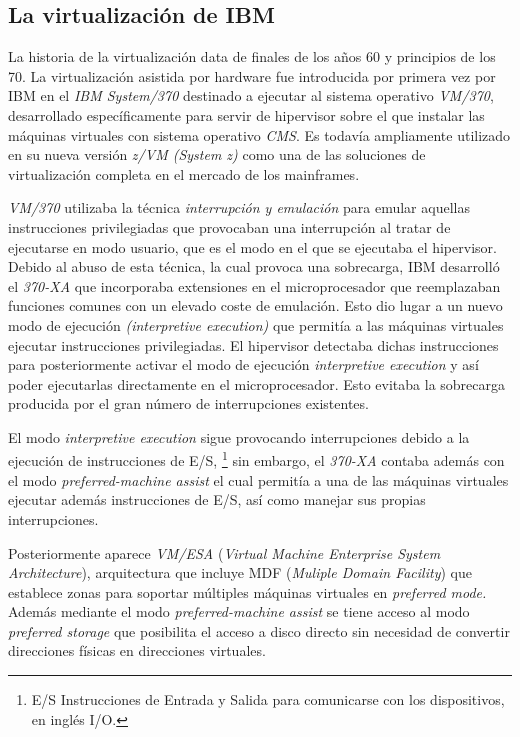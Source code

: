 \documentclass[spanisheDIVcalc,twoside,parskip-,pointlessnumbers,final]{scrbook}
\begin{document}
\subsection{La virtualización de IBM}

La historia de la virtualización data de finales de los años 60 y
principios de los 70. La virtualización asistida por hardware fue
introducida por primera vez por IBM en el \emph{IBM System/370} destinado
a ejecutar al sistema operativo \emph{VM/370}, desarrollado específicamente
para servir de hipervisor sobre el que instalar las máquinas virtuales
con sistema operativo \emph{CMS}. Es todavía ampliamente utilizado
en su nueva versión \emph{z/VM (System z)} como una de las soluciones
de virtualización completa en el mercado de los mainframes.

\emph{VM/370} utilizaba la técnica \emph{interrupción y emulación}
para emular aquellas instrucciones privilegiadas que provocaban una
interrupción al tratar de ejecutarse en modo usuario, que es el modo
en el que se ejecutaba el hipervisor. Debido al abuso de esta técnica,
la cual provoca una sobrecarga, IBM desarrolló el \emph{370-XA} que
incorporaba extensiones en el microprocesador que reemplazaban funciones
comunes con un elevado coste de emulación. Esto dio lugar a un nuevo
modo de ejecución \emph{(interpretive execution) }que permitía a las
máquinas virtuales ejecutar instrucciones privilegiadas. El hipervisor
detectaba dichas instrucciones para posteriormente activar el modo
de ejecución \emph{interpretive execution }y así poder ejecutarlas
directamente en el microprocesador. Esto evitaba la sobrecarga producida
por el gran número de interrupciones existentes.

El modo \emph{interpretive execution }sigue provocando interrupciones
debido a la ejecución de instrucciones de E/S,%
\footnote{E/S Instrucciones de Entrada y Salida para comunicarse con los dispositivos,
en inglés I/O.%
} sin embargo, el \emph{370-XA} contaba además con el modo \emph{preferred-machine
assist }el cual permitía a una de las máquinas virtuales ejecutar
además instrucciones de E/S, así como manejar sus propias interrupciones.

Posteriormente aparece \emph{VM/ESA} (\emph{Virtual Machine Enterprise
System Architecture}), arquitectura que incluye MDF (\emph{Muliple
Domain Facility}) que establece zonas para soportar múltiples máquinas
virtuales en \emph{preferred mode.} Además mediante el modo \emph{preferred-machine
assist} se tiene acceso al modo \emph{preferred storage }que posibilita
el acceso a disco directo sin necesidad de convertir direcciones físicas
en direcciones virtuales.
\end{document}
